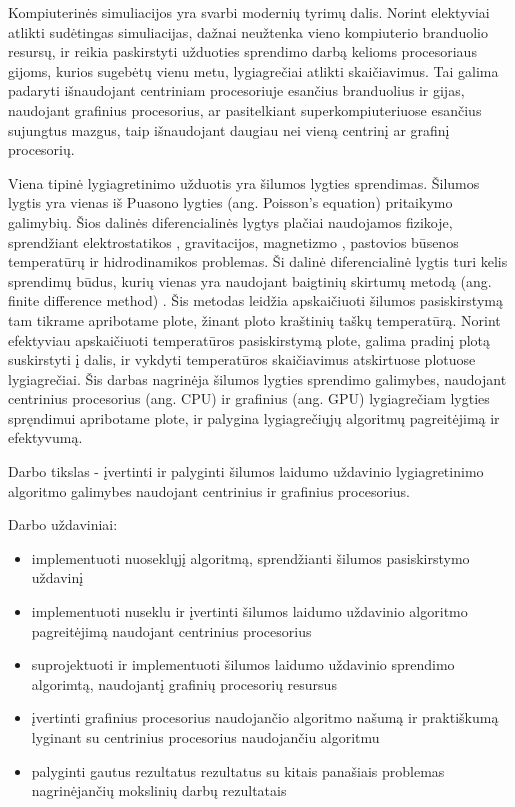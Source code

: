 \documentclass{VUMIFPSbakalaurinis}
\begin{document}
Kompiuterinės simuliacijos yra svarbi modernių tyrimų dalis. 
Norint elektyviai atlikti sudėtingas simuliacijas, dažnai neužtenka vieno kompiuterio branduolio resursų, ir reikia paskirstyti užduoties sprendimo darbą kelioms procesoriaus gijoms, kurios sugebėtų vienu metu, lygiagrečiai atlikti skaičiavimus.
Tai galima padaryti išnaudojant centriniam procesoriuje esančius branduolius ir gijas, naudojant grafinius procesorius, ar pasitelkiant superkompiuteriuose esančius sujungtus mazgus, taip išnaudojant daugiau nei vieną centrinį ar grafinį procesorių.

Viena tipinė lygiagretinimo užduotis yra šilumos lygties sprendimas. 
Šilumos lygtis yra vienas iš Puasono lygties (ang. Poisson's equation) pritaikymo galimybių. 
Šios dalinės diferencialinės lygtys plačiai naudojamos fizikoje, sprendžiant elektrostatikos \cite{house2008analytic}, gravitacijos, magnetizmo \cite{blakely1996potential}, pastovios būsenos temperatūrų \cite {berntsson2001numerical} ir hidrodinamikos \cite{kadanoff1985simulating} problemas. 
Ši dalinė diferencialinė lygtis turi kelis sprendimų būdus, kurių vienas yra naudojant baigtinių skirtumų metodą (ang. finite difference method) \cite{yoon2015analyses}.
Šis metodas leidžia apskaičiuoti šilumos pasiskirstymą tam tikrame apribotame plote, žinant ploto kraštinių taškų temperatūrą.
Norint efektyviau apskaičiuoti temperatūros pasiskirstymą plote, galima pradinį plotą suskirstyti į dalis, ir vykdyti temperatūros skaičiavimus atskirtuose plotuose lygiagrečiai.
Šis darbas nagrinėja šilumos lygties sprendimo galimybes, naudojant centrinius procesorius (ang. CPU) ir grafinius (ang. GPU) lygiagrečiam lygties spręndimui apribotame plote, ir palygina lygiagrečiųjų algoritmų pagreitėjimą ir efektyvumą. 

Darbo tikslas - įvertinti ir palyginti šilumos laidumo uždavinio lygiagretinimo algoritmo galimybes naudojant centrinius ir grafinius procesorius.

Darbo uždaviniai:
\begin{itemize}
    \item implementuoti nuoseklųjį algoritmą, sprendžianti šilumos pasiskirstymo uždavinį
    \item implementuoti nuseklu ir įvertinti šilumos laidumo uždavinio algoritmo pagreitėjimą naudojant centrinius procesorius
    \item suprojektuoti ir implementuoti šilumos laidumo uždavinio sprendimo algorimtą, naudojantį grafinių procesorių resursus
    \item įvertinti grafinius procesorius naudojančio algoritmo našumą ir praktiškumą lyginant su centrinius procesorius naudojančiu algoritmu
    \item palyginti gautus rezultatus rezultatus su kitais panašiais problemas nagrinėjančių mokslinių darbų rezultatais
\end{itemize}
\end{document}
